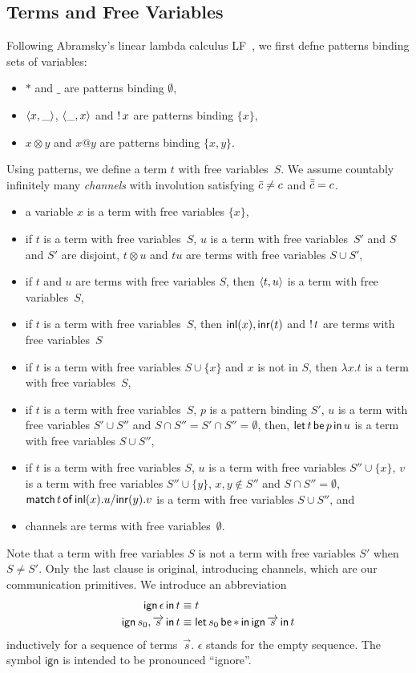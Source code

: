 \subsection{Terms and Free Variables}

Following Abramsky's linear lambda calculus
LF~\citep{abramsky1993computational}, we first defne patterns
binding sets of variables:
\begin{itemize}
 \item $\ast$ and $\_$ are patterns binding $\emptyset$,
 \item $\langle{x,\_}\rangle$, $\langle{\_,x}\rangle$ and $\mathop{!} x$ are patterns binding
       $\{x\}$,
 \item $x\otimes y$ and $x@y$ are patterns binding $\{x,y\}$.
\end{itemize}
Using patterns, we define a term $t$ with free variables~$S$.
We assume countably infinitely many \textit{channels}
with involution
satisfying $\bar{c}\neq c$ and $\bar{\bar{c}} = c$.
\begin{itemize}
 \item a variable $x$ is a term with free variables $\{x\}$,
 \item if $t$ is a term with free variables~$S$, $u$ is a term with
       free variables~$S'$ and $S$ and $S'$ are disjoint, $t\otimes u$ and
       $tu$ are terms with free variables $S\cup S'$,
 \item if $t$ and $u$ are terms with free variables $S$, then
       $\langle{t,u}\rangle$ is a term with free variables~$S$,
 \item if $t$ is a term with free variables~$S$, then
       $\mathsf{inl}({x}), \mathsf{inr}({t})$ and $\mathop{!} t$ are terms with free variables~$S$
 \item if $t$ is a term with free variables $S\cup \{x\}$ and $x$ is not
       in $S$, then $\lambda x.t$ is a term with free variables~$S$,
 \item if $t$ is a term with free variables~$S$, $p$ is a pattern
       binding $S'$, $u$ is a term with free variables $S'\cup S''$ and
       $S\cap S'' = S'\cap S'' = \emptyset$, then,
       $\mathsf{let }\,{t}\,\mathsf{ be }\,{p}\,\mathsf{ in }\,{u}$ is a term with free variables $S\cup S''$,
 \item if $t$ is a term with free variables $S$,
       $u$ is a term with free variables $S''\cup \{x\}$,
       $v$ is a term with free variables $S''\cup \{y\}$,
       $x,y\notin S''$ and $S\cap S'' = \emptyset$,
       $\mathsf{match}\,{t}\,\mathsf{of}\, \mathsf{inl}({x}). {u}/ \mathsf{inr}({y}). {v}$ is a term with free variables $S\cup S''$, and
 \item channels are terms with free variables~$\emptyset$.
\end{itemize}
Note that a term with free variables $S$ is not a term with free
variables $S'$ when $S\neq S'$.  Only the last clause is original,
introducing channels, which are our communication primitives.
We introduce an abbreviation
\begin{align*}
 \mathsf{ign }\,{\epsilon}\,\mathsf{ in }\,{t}   & \equiv t\\
 \mathsf{ign }\,{s_0,\overrightarrow s}\,\mathsf{ in }\,{t} & \equiv \mathsf{let }\,{s_0}\,\mathsf{ be }\,{\ast}\,\mathsf{ in }\,{\mathsf{ign }\,{\overrightarrow s}\,\mathsf{ in }\,{t}}
\end{align*}
inductively for a sequence of terms~$\vec s$.
$\epsilon$ stands for the empty sequence.
The symbol $\mathsf{ign}$ is intended to be pronounced ``ignore''.

